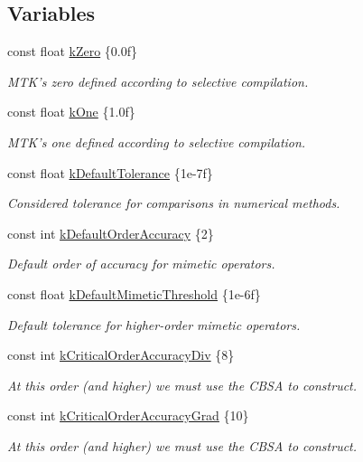 \subsection*{Variables}
\begin{DoxyCompactItemize}
\item 
const float \hyperlink{group__c01-roots_ga59a451a5fae30d59649bcda274fea271}{k\-Zero} \{0.\-0f\}
\begin{DoxyCompactList}\small\item\em M\-T\-K's zero defined according to selective compilation. \end{DoxyCompactList}\item 
const float \hyperlink{group__c01-roots_ga26407c24d43b6b95480943340d285c71}{k\-One} \{1.\-0f\}
\begin{DoxyCompactList}\small\item\em M\-T\-K's one defined according to selective compilation. \end{DoxyCompactList}\item 
const float \hyperlink{group__c01-roots_gae914b125d81d1b97e0aee7bbc7739786}{k\-Default\-Tolerance} \{1e-\/7f\}
\begin{DoxyCompactList}\small\item\em Considered tolerance for comparisons in numerical methods. \end{DoxyCompactList}\item 
const int \hyperlink{group__c01-roots_ga0d95560098eb36420511103637b6952f}{k\-Default\-Order\-Accuracy} \{2\}
\begin{DoxyCompactList}\small\item\em Default order of accuracy for mimetic operators. \end{DoxyCompactList}\item 
const float \hyperlink{group__c01-roots_ga35718d949bdc81a08a9cc8ebbe3478a2}{k\-Default\-Mimetic\-Threshold} \{1e-\/6f\}
\begin{DoxyCompactList}\small\item\em Default tolerance for higher-\/order mimetic operators. \end{DoxyCompactList}\item 
const int \hyperlink{group__c01-roots_ga0898eef2108473e44a5223932d571c31}{k\-Critical\-Order\-Accuracy\-Div} \{8\}
\begin{DoxyCompactList}\small\item\em At this order (and higher) we must use the C\-B\-S\-A to construct. \end{DoxyCompactList}\item 
const int \hyperlink{group__c01-roots_ga295dd2f403c775ecd942c22b5a777496}{k\-Critical\-Order\-Accuracy\-Grad} \{10\}
\begin{DoxyCompactList}\small\item\em At this order (and higher) we must use the C\-B\-S\-A to construct. \end{DoxyCompactList}\end{DoxyCompactItemize}


